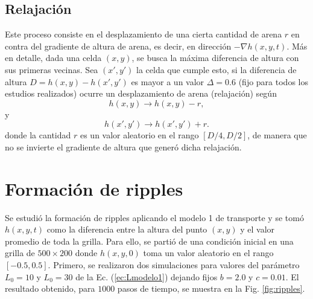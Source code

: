 \documentclass[11pt,twocolumn,twoside]{opticajnl}
\begin{document}
\subsection{Relajación}

Este proceso consiste en el desplazamiento de una cierta cantidad de arena $r$ en contra del gradiente de altura de arena, es decir, en dirección $-\nabla h(x,y,t)$. Más en detalle, dada una celda $(x,y)$, se busca la máxima diferencia de altura con sus primeras vecinas. Sea $(x',y')$ la celda que cumple esto, si la diferencia de altura $D = h(x,y) - h(x',y')$ es mayor a un valor $\Delta = 0.6$ (fijo para todos los estudios realizados) ocurre un desplazamiento de arena (relajación) según
\begin{equation}
    h(x,y) \rightarrow h(x,y) - r,
\end{equation}
y 
\begin{equation}
    h(x',y') \rightarrow h(x',y') + r.
\end{equation}
donde la cantidad $r$ es un valor aleatorio en el rango $[D/4, D/2]$, de manera que no se invierte el gradiente de altura que generó dicha relajación. 

\section{Formación de ripples}

Se estudió la formación de ripples aplicando el modelo 1 de transporte y se tomó $h(x,y,t)$ como la diferencia entre la altura del punto $(x,y)$ y el valor promedio de toda la grilla. Para ello, se partió de una condición inicial en una grilla de $500 \times 200$ donde $h(x,y,0)$ toma un valor aleatorio en el rango $[-0.5,0.5]$. Primero, se realizaron dos simulaciones para valores del parámetro $L_0=10$ y $L_0=30$ de la Ec. (\ref{ec:Lmodelo1}) dejando fijos $b=2.0$ y $c=0.01$. El resultado obtenido, para $1000$ pasos de tiempo, se muestra en la Fig. \ref{fig:ripples}.
\end{document}
